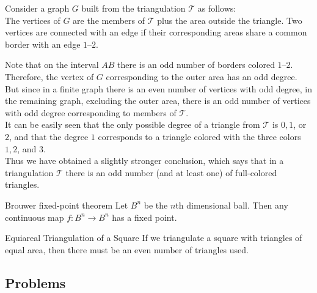 \begin{prooof}
    Consider a graph $G$ built from the triangulation $\mathcal{T}$ as
    follows:\\

    {\color{solC}The vertices of $G$ are the members of $\mathcal{T}$ plus the
    area outside the triangle.  Two vertices are connected with an edge if
    their corresponding areas share a common border with an edge $1$--$2$.\\}

    Note that on the interval $AB$ there is an odd number of borders colored
    $1$--$2$. Therefore, the vertex of $G$ corresponding to the outer area has
    an odd degree. \\

    But since in a finite graph there is an even number of
    vertices with odd degree, in the remaining graph, excluding the
    outer area, there is {\color{solC}an odd number of vertices with odd
    degree} corresponding to members of $\mathcal{T}$.\\

    It can be easily seen that the only possible degree of a triangle from
    $\mathcal{T}$ is $0, 1$, or $2$, and that the degree $1$ corresponds to a
    triangle colored with the three colors $1, 2$, and $3$.\\

    Thus we have obtained a slightly stronger conclusion, which says that in a
    triangulation $\mathcal{T}$ there is an odd number (and at least one) of
    full-colored triangles. 
\end{prooof}


{Brouwer fixed-point theorem}{
    Let $B^n$ be the $n$th dimensional ball. Then any continuous map
    $f:B^n \to B^n$ has a fixed point.
}


\theo{}
{Equiareal Triangulation of a Square}{
    If we triangulate a square with triangles of equal area, then there must
    be an even number of triangles used.
}





\newpage
\subsection{Problems}

\label{problem:constructive_algo_8}\label{problem:induction_type1_7}



